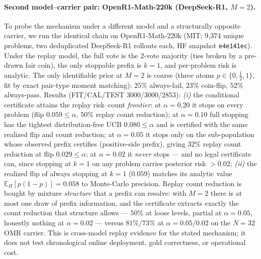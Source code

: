 \documentclass{article}
\theoremstyle{definition}
\theoremstyle{remark}
\newcommand{\E}{\mathbb{E}}
\begin{document}
\paragraph{Second model--carrier pair: OpenR1-Math-220k (DeepSeek-R1, $M=2$).}
To probe the mechanism under a different model and a structurally opposite
carrier, we run the identical chain on OpenR1-Math-220k (MIT; 9{,}374 unique
problems, two deduplicated DeepSeek-R1 rollouts each, HF snapshot
\texttt{e4e141ec}). Under the replay model, the full vote is
the 2-vote majority (ties broken by a pre-drawn fair coin), the only stoppable
prefix is $k=1$, and per-problem risk is analytic. The only identifiable
prior at $M=2$ is coarse (three atoms $p\in\{0,\tfrac12,1\}$, fit by exact
pair-type moment matching): $25\%$ always-fail, $23\%$ coin-flip, $52\%$
always-pass. Results (FIT/CAL/TEST 3000/3000/2853):
\emph{(i)} the conditional certificate attains the replay risk--count \emph{frontier}:
at $\alpha=0.20$ it stops on every problem (flip $0.059\le\alpha$,
$50\%$ replay count reduction); at $\alpha=0.10$ full stopping has the tightest
distribution-free UCB $0.080\le\alpha$ and is certified with the same
realized flip and count reduction; at $\alpha=0.05$ it stops only on the
sub-population whose observed prefix certifies (positive-side prefix),
giving $32\%$ replay count reduction at flip $0.029\le\alpha$; at $\alpha=0.02$ it \emph{never}
stops --- and no legal certificate can, since stopping at $k{=}1$ on any
problem carries posterior risk $>0.02$; \emph{(ii)} the realized flip of
always stopping at $k{=}1$ ($0.059$) matches its analytic value
$\E_H[p(1{-}p)]=0.058$ to Monte-Carlo precision. Replay count reduction is bought by mixture \emph{structure} that a prefix can
resolve: with $M=2$ there is at most one draw of prefix information, and the
certificate extracts exactly the count reduction that structure allows --- $50\%$ at
loose levels, partial at $\alpha=0.05$, honestly nothing at $\alpha=0.02$ ---
versus $81\%$/$73\%$ at $\alpha=0.05/0.02$ on the $N{=}32$ OMR carrier. This
is cross-model replay evidence for the stated mechanism; it does not test
chronological online deployment, gold correctness, or operational cost.
\end{document}
